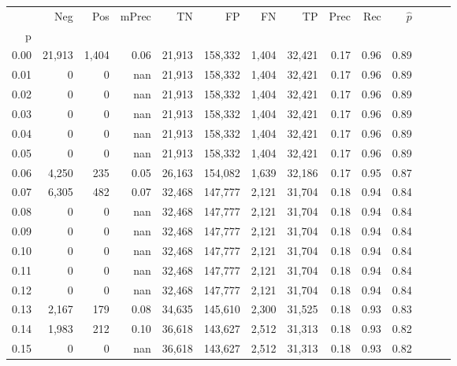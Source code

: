 \begin{tabular}{rrrrrrrrrrrrrr}
\toprule
{} &     Neg &    Pos & mPrec &       TN &       FP &      FN &      TP &  Prec &   Rec & $\hat{p}$ \\
p    &         &        &       &          &          &         &         &       &       &           \\
\midrule
0.00 &  21,913 &  1,404 &  0.06 &   21,913 &  158,332 &   1,404 &  32,421 &  0.17 &  0.96 &      0.89 \\
0.01 &       0 &      0 &   nan &   21,913 &  158,332 &   1,404 &  32,421 &  0.17 &  0.96 &      0.89 \\
0.02 &       0 &      0 &   nan &   21,913 &  158,332 &   1,404 &  32,421 &  0.17 &  0.96 &      0.89 \\
0.03 &       0 &      0 &   nan &   21,913 &  158,332 &   1,404 &  32,421 &  0.17 &  0.96 &      0.89 \\
0.04 &       0 &      0 &   nan &   21,913 &  158,332 &   1,404 &  32,421 &  0.17 &  0.96 &      0.89 \\
0.05 &       0 &      0 &   nan &   21,913 &  158,332 &   1,404 &  32,421 &  0.17 &  0.96 &      0.89 \\
0.06 &   4,250 &    235 &  0.05 &   26,163 &  154,082 &   1,639 &  32,186 &  0.17 &  0.95 &      0.87 \\
0.07 &   6,305 &    482 &  0.07 &   32,468 &  147,777 &   2,121 &  31,704 &  0.18 &  0.94 &      0.84 \\
0.08 &       0 &      0 &   nan &   32,468 &  147,777 &   2,121 &  31,704 &  0.18 &  0.94 &      0.84 \\
0.09 &       0 &      0 &   nan &   32,468 &  147,777 &   2,121 &  31,704 &  0.18 &  0.94 &      0.84 \\
0.10 &       0 &      0 &   nan &   32,468 &  147,777 &   2,121 &  31,704 &  0.18 &  0.94 &      0.84 \\
0.11 &       0 &      0 &   nan &   32,468 &  147,777 &   2,121 &  31,704 &  0.18 &  0.94 &      0.84 \\
0.12 &       0 &      0 &   nan &   32,468 &  147,777 &   2,121 &  31,704 &  0.18 &  0.94 &      0.84 \\
0.13 &   2,167 &    179 &  0.08 &   34,635 &  145,610 &   2,300 &  31,525 &  0.18 &  0.93 &      0.83 \\
0.14 &   1,983 &    212 &  0.10 &   36,618 &  143,627 &   2,512 &  31,313 &  0.18 &  0.93 &      0.82 \\
0.15 &       0 &      0 &   nan &   36,618 &  143,627 &   2,512 &  31,313 &  0.18 &  0.93 &      0.82 \\

\end{tabular}
